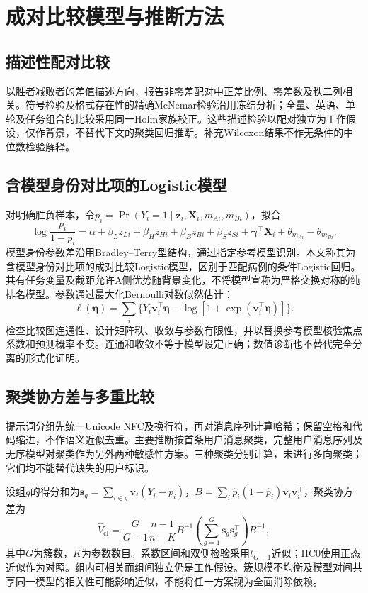 \section{成对比较模型与推断方法}
\subsection{描述性配对比较}
以胜者减败者的差值描述方向，报告非零差配对中正差比例、零差数及秩二列相关。符号检验及格式存在性的精确McNemar检验沿用冻结分析；全量、英语、单轮及任务组合的比较采用同一Holm家族校正\cite{holm}。这些描述检验以配对独立为工作假设，仅作背景，不替代下文的聚类回归推断。补充Wilcoxon结果不作无条件的中位数检验解释。

\subsection{含模型身份对比项的Logistic模型}
对明确胜负样本，令$p_i=\Pr(Y_i=1\mid\bm z_i,\bm X_i,m_{Ai},m_{Bi})$，拟合
\begin{equation}\label{eq:logit}
 \log\frac{p_i}{1-p_i}=\alpha+\beta_Lz_{Li}+\beta_Hz_{Hi}
 +\beta_Bz_{Bi}+\beta_Sz_{Si}+\bm\gamma^\top\bm X_i
 +\theta_{m_{Ai}}-\theta_{m_{Bi}}.
\end{equation}
模型身份参数差沿用Bradley--Terry型结构\cite{bradley,firth}，通过指定参考模型识别。本文称其为含模型身份对比项的成对比较Logistic模型，区别于匹配病例的条件Logistic回归。共有任务变量及截距允许A侧优势随背景变化，不将模型宣称为严格交换对称的纯排名模型。参数通过最大化Bernoulli对数似然估计：
\begin{equation}
 \ell(\bm\eta)=\sum_i\{Y_i\bm v_i^\top\bm\eta-\log[1+\exp(\bm v_i^\top\bm\eta)]\}.
\end{equation}
检查比较图连通性、设计矩阵秩、收敛与参数有限性，并以替换参考模型核验焦点系数和预测概率不变。连通和收敛不等于模型设定正确；数值诊断也不替代完全分离的形式化证明。

\subsection{聚类协方差与多重比较}
提示词分组先统一Unicode NFC及换行符，再对消息序列计算哈希；保留空格和代码缩进，不作语义近似去重。主要推断按首条用户消息聚类，完整用户消息序列及无序模型对聚类作为另外两种敏感性方案。三种聚类分别计算，未进行多向聚类；它们均不能替代缺失的用户标识。

设组$g$的得分和为$\bm s_g=\sum_{i\in g}\bm v_i(Y_i-\widehat p_i)$，$B=\sum_i\widehat p_i(1-\widehat p_i)\bm v_i\bm v_i^\top$，聚类协方差为\cite{cameron}
\begin{equation}
 \widehat V_{\mathrm{cl}}=\frac{G}{G-1}\frac{n-1}{n-K}
 B^{-1}\left(\sum_{g=1}^G\bm s_g\bm s_g^\top\right)B^{-1},
\end{equation}
其中$G$为簇数，$K$为参数数目。系数区间和双侧检验采用$t_{G-1}$近似；HC0使用正态近似作为对照。组内可相关而组间独立仍是工作假设。簇规模不均衡及模型对间共享同一模型的相关性可能影响近似，不能将任一方案视为全面消除依赖。

